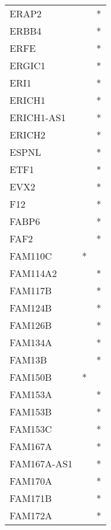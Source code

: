 \begin{longtable}{lcc}
ERAP2           &                &          * \\
ERBB4           &                &          * \\
ERFE            &                &          * \\
ERGIC1          &                &          * \\
ERI1            &                &          * \\
ERICH1          &                &          * \\
ERICH1-AS1      &                &          * \\
ERICH2          &                &          * \\
ESPNL           &                &          * \\
ETF1            &                &          * \\
EVX2            &                &          * \\
F12             &                &          * \\
FABP6           &                &          * \\
FAF2            &                &          * \\
FAM110C         &              * &            \\
FAM114A2        &                &          * \\
FAM117B         &                &          * \\
FAM124B         &                &          * \\
FAM126B         &                &          * \\
FAM134A         &                &          * \\
FAM13B          &                &          * \\
FAM150B         &              * &            \\
FAM153A         &                &          * \\
FAM153B         &                &          * \\
FAM153C         &                &          * \\
FAM167A         &                &          * \\
FAM167A-AS1     &                &          * \\
FAM170A         &                &          * \\
FAM171B         &                &          * \\
FAM172A         &                &          * \\

\end{longtable}
